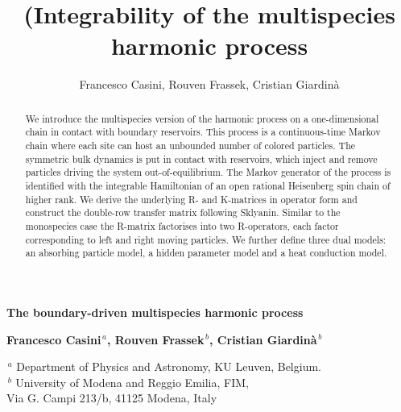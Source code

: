 \documentclass[11pt]{article}
\title{(Integrability of the multispecies harmonic process}
\author{Francesco Casini, Rouven Frassek, Cristian Giardinà}
\numberwithin{equation}{section}
\begin{document}
\begingroup
\begin{center}

\vspace{5em}
 \begingroup\LARGE
 \bf The boundary-driven multispecies harmonic process
\par\endgroup
 \vspace{3.5em}
 \begingroup\large \bf
Francesco Casini$^{\,a}$, Rouven Frassek$^{\,b}$, Cristian Giardinà$^{\,b}$
 \par\endgroup
\vspace{2em}
\begin{center}
$^{\,a}$ {\normalsize Department of Physics and Astronomy, KU Leuven, Belgium.}
\\[0.1in]
$^{\,b}$ University of Modena and Reggio Emilia, FIM,\\
Via G. Campi 213/b, 41125 Modena, Italy
\\[0.6in]
 \end{center}

\vspace{-2em}

\end{center}
 \begin{abstract}
We introduce the multispecies version of the harmonic process on a one-dimensional chain in contact with boundary reservoirs. This process is a continuous-time Markov chain where each site can host an unbounded number of colored particles. The symmetric bulk dynamics is put in contact with reservoirs, which inject and remove particles driving the system out-of-equilibrium. The Markov generator of the process is identified with the integrable Hamiltonian of an open rational Heisenberg spin chain of higher rank. We derive the underlying R- and K-matrices in operator form and construct the double-row transfer matrix following Sklyanin. Similar to the monospecies case the R-matrix factorises into two R-operators, each factor corresponding to left and right moving particles.
We further define three dual models: an absorbing particle model, a hidden parameter model and a heat conduction model.

\end{abstract}





\tableofcontents
\end{document}
